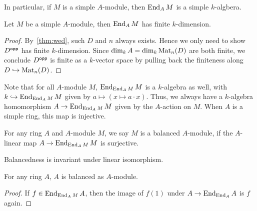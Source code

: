 \begin{remark}
  In particular, if $M$ is a simple $A$-module, then $\operatorname{End}_{A}M$ is a simple
  $k$-algbera.
\end{remark}

\begin{lemma}
  Let $M$ be a simple $A$-module, then $\operatorname{End}_{A}M$ has finite $k$-dimension.
  \leanok
\end{lemma}
\begin{proof}
  By~\cref{thm:wed}, such $D$ and $n$ always exists. Hence we only need to show
  $D^{\mathsf{opp}}$ has finite $k$-dimension. Since $\dim_{k}A=\dim_{k}\operatorname{Mat}_{n}(D)$ are
  both finite, we conclude $D^{\mathsf{opp}}$ is finite as a $k$-vector space by pulling
  back the finiteness along $D \hookrightarrow \operatorname{Mat}_{n}(D)$.
\end{proof}

\begin{remark}
  Note that for all $A$-module $M$, $\operatorname{End}_{\operatorname{End}_{A}M}M$ is a $k$-algebra as
  well, with $k \hookrightarrow \operatorname{End}_{\operatorname{End}_{A}M}M$ given by
  $a \mapsto (x \mapsto a\cdot x)$. Thus, we always have a $k$-algebra
  homomorphism $A \to \operatorname{End}_{\operatorname{End}_{A}M}M$ given by the $A$-action on $M$. When
  $A$ is a simple ring, this map is injective.
\end{remark}

\begin{definition}\label{def:balanced-mod}
  \leanok
  For any ring $A$ and $A$-module $M$, we say $M$ is a
  balanced $A$-module, if the $A$-linear map $A \to \operatorname{End}_{\operatorname{End}_{A}M}M$ is
  surjective.
\end{definition}

\begin{remark}
  Balancedness is invariant under linear isomorphism.
\end{remark}

\begin{lemma}\label{lem:balanced-self}
  For any ring $A$, $A$ is balanced as $A$-module. \leanok
\end{lemma}
\begin{proof}
  If $f \in \operatorname{End}_{\operatorname{End}_{A}M}A$, then the image of $f(1)$ under
  $A \to\operatorname{End}_{\operatorname{End}_{A}}A$ is $f$ again.
\end{proof}

